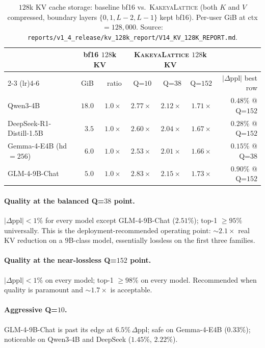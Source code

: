 \documentclass[11pt,a4paper]{article}
\theoremstyle{definition}
\theoremstyle{plain}
\newcommand{\abs}[1]{\left\lvert#1\right\rvert}
\begin{document}
\begin{table}[H]
\centering
\small
\caption{$128$k KV cache storage: baseline bf16 vs.\
\textsc{KakeyaLattice} (both $K$ and $V$ compressed, boundary
layers $\{0,1,L{-}2,L{-}1\}$ kept bf16). Per-user GiB at ctx $=128{,}000$.
Source:
\texttt{reports/v1\_4\_release/kv\_128k\_report/V14\_KV\_128K\_REPORT.md}.}
\label{tab:128k}
\begin{tabular}{lrrrrrr}
  \toprule
   & \multicolumn{2}{c}{bf16 $128$k KV} & \multicolumn{3}{c}{\textsc{KakeyaLattice} $128$k KV} & \\
  \cmidrule(lr){2-3} \cmidrule(lr){4-6}
   & GiB & ratio & Q=$10$ & Q=$38$ & Q=$152$ & $\abs{\Delta\text{ppl}}$ best row \\
  \midrule
  Qwen3-4B                       & $18.0$ & $1.0\times$ & $2.77\times$ & $2.12\times$ & $1.71\times$ & $0.48\%$ @ Q=$152$ \\
  DeepSeek-R1-Distill-1.5B        & $ 3.5$ & $1.0\times$ & $2.60\times$ & $2.04\times$ & $1.67\times$ & $0.28\%$ @ Q=$152$ \\
  Gemma-4-E4B (hd $=\!256$)      & $ 6.0$ & $1.0\times$ & $2.53\times$ & $2.01\times$ & $1.66\times$ & $0.15\%$ @ Q=$38$  \\
  GLM-4-9B-Chat                  & $ 5.0$ & $1.0\times$ & $2.83\times$ & $2.15\times$ & $1.73\times$ & $0.90\%$ @ Q=$152$ \\
  \bottomrule
\end{tabular}
\end{table}

\paragraph{Quality at the balanced Q=$38$ point.}
$|\Delta\text{ppl}| < 1\%$ for every model except GLM-4-9B-Chat
($2.51\%$); top-1 $\geq 95\%$ universally.  This is the
deployment-recommended operating point: $\sim\!2.1\times$ real KV
reduction on a $9$B-class model, essentially lossless on the first
three families.

\paragraph{Quality at the near-lossless Q=$152$ point.}
$|\Delta\text{ppl}| < 1\%$ on every model; top-1 $\geq 98\%$ on
every model. Recommended when quality is paramount and
$\sim\!1.7\times$ is acceptable.

\paragraph{Aggressive Q=$10$.} GLM-4-9B-Chat is past its edge at
$6.5\%\,\Delta\text{ppl}$; safe on Gemma-4-E4B ($0.33\%$); noticeable
on Qwen3-4B and DeepSeek ($1.45\%$, $2.22\%$).
\end{document}

